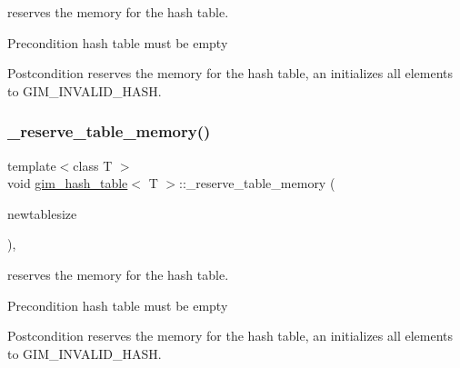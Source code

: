 reserves the memory for the hash table. 

\begin{DoxyPrecond}{Precondition}
hash table must be empty 
\end{DoxyPrecond}
\begin{DoxyPostcond}{Postcondition}
reserves the memory for the hash table, an initializes all elements to G\+I\+M\+\_\+\+I\+N\+V\+A\+L\+I\+D\+\_\+\+H\+A\+SH. 
\end{DoxyPostcond}
\mbox{\label{classgim__hash__table_a4d9347e131c0e17ac2d4966c092817f8}} 
\subsubsection{\texorpdfstring{\+\_\+reserve\+\_\+table\+\_\+memory()}{\_reserve\_table\_memory()}\hspace{0.1cm}{\footnotesize\ttfamily [2/2]}}
{\footnotesize\ttfamily template$<$class T $>$ \\
void \hyperlink{classgim__hash__table}{gim\+\_\+hash\+\_\+table}$<$ T $>$\+::\+\_\+reserve\+\_\+table\+\_\+memory (\begin{DoxyParamCaption}\item[{G\+U\+I\+NT}]{newtablesize }\end{DoxyParamCaption})\hspace{0.3cm}{\ttfamily [inline]}, {\ttfamily [protected]}}



reserves the memory for the hash table. 

\begin{DoxyPrecond}{Precondition}
hash table must be empty 
\end{DoxyPrecond}
\begin{DoxyPostcond}{Postcondition}
reserves the memory for the hash table, an initializes all elements to G\+I\+M\+\_\+\+I\+N\+V\+A\+L\+I\+D\+\_\+\+H\+A\+SH. 
\end{DoxyPostcond}
\mbox{\label{classgim__hash__table_a14261b2d7de34188f8bc5179e4d60760}} 
